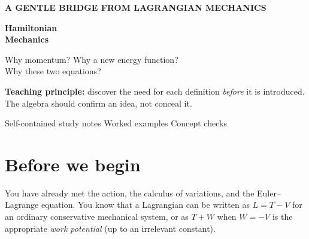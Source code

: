 \documentclass[11pt,a4paper,oneside]{article}
\begin{document}
\begin{titlepage}
\thispagestyle{empty}
\vspace*{13mm}
{\color{teal}\large\bfseries A GENTLE BRIDGE FROM LAGRANGIAN MECHANICS}\par
\vspace{13mm}
{\fontsize{32}{38}\selectfont\bfseries\color{deep} Hamiltonian\\[4pt]Mechanics}\par
\vspace{7mm}
{\Large\color{ink}Why momentum? Why a new energy function?\\Why these two equations?}\par
\vspace{17mm}
\begin{center}
\end{center}
\vfill
\begin{minipage}{0.87\linewidth}
\color{ink!85}\large
\textbf{Teaching principle:} discover the need for each definition \emph{before} it is introduced. The algebra should confirm an idea, not conceal it.
\end{minipage}
\vspace{18mm}
\color{ink!65}\small Self-contained study notes \quad\textbullet\quad Worked examples \quad\textbullet\quad Concept checks
\end{titlepage}
\setcounter{page}{1}

\section*{Before we begin}
You have already met the action, the calculus of variations, and the Euler--Lagrange equation. You know that a Lagrangian can be written as $L=T-V$ for an ordinary conservative mechanical system, or as $T+W$ when $W=-V$ is the appropriate \emph{work potential} (up to an irrelevant constant).
\end{document}
